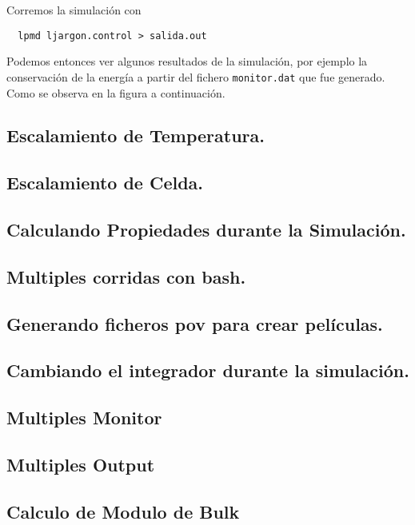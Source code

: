 Corremos la simulaci\'on con 
\begin{verbatim}
  lpmd ljargon.control > salida.out
\end{verbatim}

Podemos entonces ver algunos resultados de la simulaci\'on, por ejemplo la conservaci\'on de la energ\'ia a partir del fichero \verb|monitor.dat| que fue generado. Como se observa en la figura a continuaci\'on.

\subsection{Escalamiento de Temperatura.}

\subsection{Escalamiento de Celda.}

\subsection{Calculando Propiedades durante la Simulaci\'on.}

\subsection{Multiples corridas con bash.}

\subsection{Generando ficheros pov para crear pel\'iculas.}

\subsection{Cambiando el integrador durante la simulaci\'on.}

\subsection{Multiples Monitor}

\subsection{Multiples Output}

\subsection{Calculo de Modulo de Bulk}

